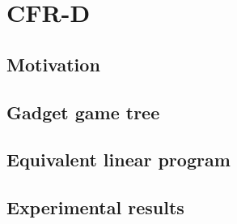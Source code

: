 \chapter{CFR-D}

\section{Motivation}

\section{Gadget game tree}

\section{Equivalent linear program}

\section{Experimental results}
